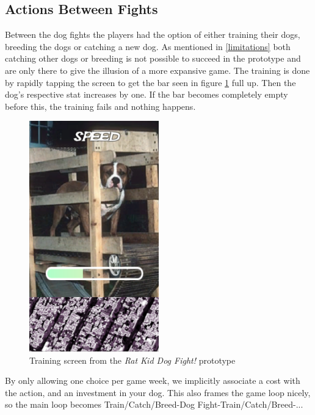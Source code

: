 \subsection{Actions Between Fights}
Between the dog fights the players had the option of either training their dogs, breeding the dogs or catching a new dog. As mentioned in \ref{limitations} both catching other dogs or breeding is not possible to succeed in the prototype and are only there to give the illusion of a more expansive game. The training is done by rapidly tapping the screen to get the bar seen in figure \ref{fig:training} full up. Then the dog's respective stat increases by one. If the bar becomes completely empty before this, the training fails and nothing happens.\ 


\begin{figure}[h!] 
	\centering
    \includegraphics[width=0.5\textwidth]{Training.png}
    \caption{Training screen from the \textit{Rat Kid Dog Fight!} prototype}
    \label{fig:training}
\end{figure}

By only allowing one choice per game week, we implicitly associate a cost with the action, and an investment in your dog. This also frames the game loop nicely, so the main loop becomes Train/Catch/Breed-\>Dog Fight-\>Train/Catch/Breed-\>... \